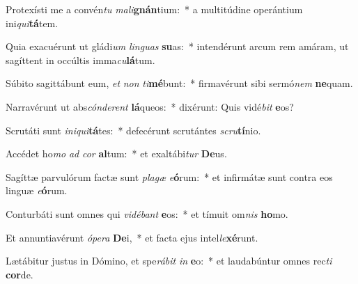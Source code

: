 \item Protexísti me a convén\textit{tu} \textit{ma}\textit{li}\textbf{gnán}tium:~* a multitúdine operántium ini\textit{qui}\textbf{tá}tem.
\item Quia exacuérunt ut gládi\textit{um} \textit{lin}\textit{guas} \textbf{su}as:~* intendérunt arcum rem amáram, ut sagíttent in occúltis imma\textit{cu}\textbf{lá}tum.
\item Súbito sagittábunt eum, \textit{et} \textit{non} \textit{ti}\textbf{mé}bunt:~* firmavérunt sibi sermó\textit{nem} \textbf{ne}quam.
\item Narravérunt ut abs\textit{cón}\textit{de}\textit{rent} \textbf{lá}queos:~* dixérunt: Quis vidé\textit{bit} \textbf{e}os?
\item Scrutáti sunt \textit{in}\textit{i}\textit{qui}\textbf{tá}tes:~* defecérunt scrutántes \textit{scru}\textbf{tí}nio.
\item Accédet ho\textit{mo} \textit{ad} \textit{cor} \textbf{al}tum:~* et exaltábi\textit{tur} \textbf{De}us.
\item Sagíttæ parvulórum factæ sunt \textit{pla}\textit{gæ} \textit{e}\textbf{ó}rum:~* et infirmátæ sunt contra eos linguæ \textit{e}\textbf{ó}rum.
\item Conturbáti sunt omnes qui \textit{vi}\textit{dé}\textit{bant} \textbf{e}os:~* et tímuit om\textit{nis} \textbf{ho}mo.
\item Et annuntiavérunt \textit{ó}\textit{pe}\textit{ra} \textbf{De}i,~* et facta ejus intel\textit{le}\textbf{xé}runt.
\item Lætábitur justus in Dómino, et spe\textit{rá}\textit{bit} \textit{in} \textbf{e}o:~* et laudabúntur omnes rec\textit{ti} \textbf{cor}de.

